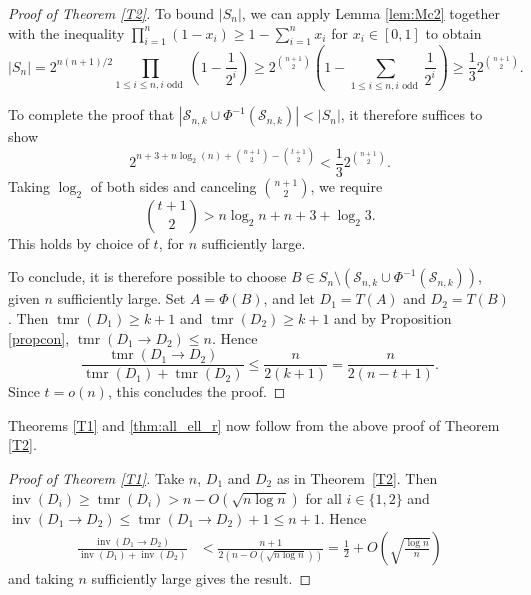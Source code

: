 \documentclass[10pt,a4paper]{amsart}
\numberwithin{equation}{section}
\theoremstyle{plain}
\theoremstyle{remark}
\theoremstyle{definition}
\newcommand{\lb}{\left(}
\newcommand{\rb}{\right)}
\newcommand{\tmr}{\operatorname{tmr}}
\newcommand{\inv}{\operatorname{inv}}
\begin{document}
\begin{proof}[Proof of Theorem \ref{T2}]
   To bound $|S_n|$, we can apply Lemma \ref{lem:Mc2} together with the inequality $\prod_{i=1}^n (1-x_i) \geq 1 - \sum_{i=1}^n x_i$ for $x_i \in [0,1]$ to obtain
    \begin{equation*}
         |S_n| = 2^{n(n+1)/2} \prod_{1 \leq i \le n, i \text{ odd  }} \lb1-\frac{1}{2^i}\rb \geq 2^{\binom{n+1}{2}} \lb1 - \sum_{1 \leq i \le n, i \text{ odd  }}\frac{1}{2^i}\rb \geq \frac{1}{3} 2^{\binom{n+1}{2}}.
    \end{equation*}
    
    To complete the proof that $|{\mathcal{S}_{n, k} \cup \Phi^{-1}(\mathcal{S}_{n, k})} | < |S_n|$, it therefore suffices to show
    \begin{equation*}
       2^{n+3 +n\log_2(n) + \binom{n+1}{2}-\binom{t+1}{2}} <  \frac{1}{3} 2^{\binom{n+1}{2}}.
    \end{equation*}
    Taking $\log_2 $ of both sides and canceling $ \binom{n+1}{2}$, we require
    \begin{equation*}
        \binom{t+1}{2} > n\log_2 n + n + 3 + \log_2{3}.
    \end{equation*}
    This holds by choice of $t$, for $n$ sufficiently large.
    
    To conclude, it is therefore possible to choose $B \in S_n \setminus ({\mathcal{S}_{n, k} \cup \Phi^{-1}(\mathcal{S}_{n, k})} )$, given $n$ sufficiently large. Set $A = \Phi(B)$, and let $D_1 = T(A)$ and $D_2 = T(B)$. Then $\tmr(D_1) \geq k+1$ and $\tmr(D_2) \geq k+1$ and by Proposition \ref{propcon}, $\tmr(D_1 \to D_2) \leq n$. Hence 
    \begin{equation*}
        \frac{\tmr(D_1 \to D_2)}{\tmr(D_1) + \tmr( D_2)}  \leq \frac{n}{2(k+1)} = \frac{n}{2(n-t+1)} .
    \end{equation*}
    Since $t = o(n)$, this concludes the proof.
\end{proof}


Theorems \ref{T1} and \ref{thm:all_ell_r} now follow from the above proof of Theorem \ref{T2}.


 \begin{proof}[Proof of Theorem \ref{T1}]
Take $n$, $D_1$ and $D_2$ as in Theorem~\ref{T2}. Then $\inv(D_i) \geq \tmr(D_i) > n-O(\sqrt{n\log{n}})$ for all $i \in \{1,2\}$ and $\inv(D_1 \to D_2) \leq \tmr(D_1 \to D_2) +1 \le n+1$. Hence
\begin{align*}
    \frac{\inv(D_1 \to D_2)}{\inv(D_1) + \inv(D_2)} &<  \frac{n+1}{2\lb n-O(\sqrt{n\log{n}})\rb} 
    = \frac{1}{2} + O\lb\sqrt{\frac{\log{n}}{n}}\rb
\end{align*}
and taking $n$ sufficiently large gives the result.
 \end{proof}
\end{document}
